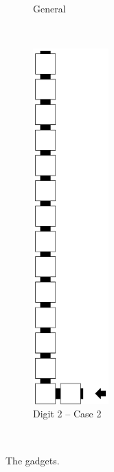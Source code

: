 \begin{itemize}
\begin{figure}[H]
\begin{subfigure}[t]{0.32\textwidth}
                \caption{\label{fig:warp_bridge_general} General}
            \end{subfigure}%
            ~
            \begin{subfigure}[t]{0.32\textwidth}
                \centering
                \includegraphics[width=0.32\textwidth]{warping_warp_bridge_case2_digit2_msr}
                \caption{\label{fig:warp_bridge_case2_digit2_msr} Digit 2 -- Case 2}
            \end{subfigure}%
            ~\caption{\label{fig:warp_bridge} The {\warpbridge} gadgets.}
        \end{figure}



\end{itemize}
